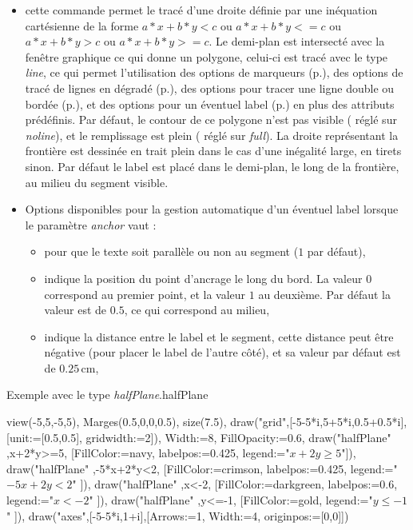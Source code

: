 \begin{itemize}
 \item\desc cette commande permet le tracé d'une droite définie par une inéquation cartésienne de la forme $a*x+b*y<c$ ou $a*x+b*y<=c$ ou $a*x+b*y>c$ ou $a*x+b*y>=c$. Le demi-plan est intersecté avec la fenêtre graphique ce qui donne un polygone, celui-ci est tracé avec le type \emph{line}, ce qui permet l'utilisation des options de marqueurs (p.\pageref{marqueurs}), des options de tracé de lignes en dégradé (p.\pageref{gradLines}), des options pour tracer une ligne double ou bordée (p.\pageref{optionsline}), et des options pour un éventuel label (p.\pageref{optionslabels}) en plus des attributs prédéfinis. Par défaut, le contour de ce polygone n'est pas visible ( réglé sur \emph{noline}), et le remplissage est plein ( réglé sur \emph{full}). La droite représentant la frontière est dessinée en trait plein dans le cas d'une inégalité large, en tirets sinon. Par défaut le label est placé dans le demi-plan, le long de la frontière, au milieu du segment visible. 
 \item Options disponibles pour la gestion automatique d'un éventuel label lorsque le paramètre \emph{anchor} vaut :
  \begin{itemize}
   \item {} pour que le texte soit parallèle ou non au segment ($1$ par défaut),
   \item {} indique la position du point d'ancrage le long du bord. La valeur $0$ correspond au premier point, et la valeur $1$ au deuxième. Par défaut la valeur est de $0.5$, ce qui correspond au milieu,
   \item {} indique la distance entre le label et le segment, cette distance peut être négative (pour placer le label de l'autre côté), et sa valeur par défaut est de $0.25$\,cm,
  \end{itemize}
\end{itemize}  

\begin{demo}{Exemple avec le type \emph{halfPlane}.}{halfPlane}
\begin{texgraph}[name=halfPlane]
view(-5,5,-5,5), Marges(0.5,0,0,0.5), size(7.5),
draw("grid",[-5-5*i,5+5*i,0.5+0.5*i],[unit:=[0.5,0.5],
 gridwidth:=2]),
Width:=8, FillOpacity:=0.6,
draw("halfPlane" ,x+2*y>=5, [FillColor:=navy,
 labelpos:=0.425, legend:="$x+2y \geqslant 5$"]),
draw("halfPlane" ,-5*x+2*y<2, [FillColor:=crimson,
 labelpos:=0.425, legend:="$-5x+2y< 2$" ]),
draw("halfPlane" ,x<-2, [FillColor:=darkgreen,
 labelpos:=0.6, legend:="$x<-2$" ]),
draw("halfPlane" ,y<=-1, [FillColor:=gold,
 legend:="$y\leqslant -1$" ]),
draw("axes",[-5-5*i,1+i],[Arrows:=1, Width:=4,
 originpos:=[0,0]])
\end{texgraph}
\end{demo}

